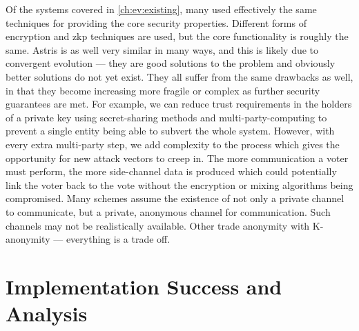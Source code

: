 Of the systems covered in \autoref{ch:ev:existing}, many used effectively the same techniques for providing the core security properties. Different forms of encryption and \gls{zkp} techniques are used, but the core functionality is roughly the same. Astris is as well very similar in many ways, and this is likely due to convergent evolution --- they are good solutions to the problem and obviously better solutions do not yet exist. They all suffer from the same drawbacks as well, in that they become increasing more fragile or complex as further security guarantees are met. For example, we can reduce trust requirements in the holders of a private key using secret-sharing methods and multi-party-computing to prevent a single entity being able to subvert the whole system. However, with every extra multi-party step, we add complexity to the process which gives the opportunity for new attack vectors to creep in. The more communication a voter must perform, the more side-channel data is produced which could potentially link the voter back to the vote without the encryption or mixing algorithms being compromised. Many schemes assume the existence of not only a private channel to communicate, but a private, anonymous channel for communication. Such channels may not be realistically available. Other trade anonymity with K-anonymity --- everything is a trade off.



\section{Implementation Success and Analysis}
\label{ch:analysis:impl}

